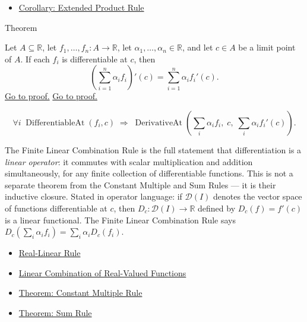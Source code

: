 \begin{dependencies}
\begin{itemize}
  \item \hyperref[cor:extended-product-rule]{Corollary: Extended Product Rule}
\end{itemize}
\end{dependencies}


\begin{theorembox}{Theorem}
\begin{theorem}
\label{thm:finite-linear-combination-rule}
Let $A \subseteq \mathbb{R}$, let $f_1, \dots, f_n : A \to \mathbb{R}$, let $\alpha_1, \dots, \alpha_n \in \mathbb{R}$, and let $c \in A$ be a limit point of $A$. If each $f_i$ is differentiable at $c$, then
\[
\left(\sum_{i=1}^{n} \alpha_i f_i\right)'(c) = \sum_{i=1}^{n} \alpha_i f_i'(c).
\]
\hyperref[prf:finite-linear-combination]{Go to proof.}
\hyperref[prf:finite-linear-combination-rule]{Go to proof.}
\end{theorem}
\end{theorembox}

\begin{remark*}
\[
\forall i\;\operatorname{DifferentiableAt}(f_i,c)
\;\Rightarrow\;
\operatorname{DerivativeAt}\!\left(\textstyle\sum_i\alpha_i f_i,\;c,\;\textstyle\sum_i\alpha_i f_i'(c)\right).
\]
\end{remark*}

\begin{remark*}[Interpretation]
The Finite Linear Combination Rule is the full statement that differentiation is a \emph{linear operator}: it commutes with scalar multiplication and addition simultaneously, for any finite collection of differentiable functions. This is not a separate theorem from the Constant Multiple and Sum Rules --- it is their inductive closure. Stated in operator language: if $\mathcal{D}(I)$ denotes the vector space of functions differentiable at $c$, then $D_c : \mathcal{D}(I) \to \mathbb{R}$ defined by $D_c(f) = f'(c)$ is a linear functional. The Finite Linear Combination Rule says $D_c(\sum_i \alpha_i f_i) = \sum_i \alpha_i D_c(f_i)$.
\end{remark*}

\begin{dependencies}
\begin{itemize}
  \item \hyperref[def:real-linear-rule]{Real-Linear Rule}
  \item \hyperref[def:linear-combination-of-real-valued-functions]{Linear Combination of Real-Valued Functions}
  \item \hyperref[thm:constant-multiple-rule]{Theorem: Constant Multiple Rule}
  \item \hyperref[thm:sum-rule]{Theorem: Sum Rule}
\end{itemize}
\end{dependencies}

